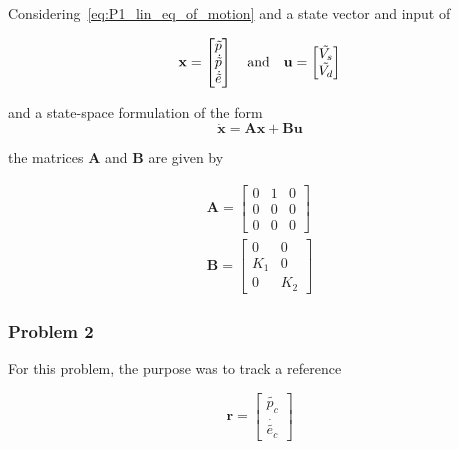 Considering~\cref{eq:P1_lin_eq_of_motion} and a state vector and input of  

\begin{equation}\label{P3_state_vector_and_input}
    \mathbf{x}=
    \begin{bmatrix}
        \tilde{p}\\
        \dot{\tilde{p}}\\
        \dot{\tilde{e}}
    \end{bmatrix}
    \quad\text{and}\quad
    \mathbf{u}=
    \begin{bmatrix}
        \tilde{V_s}\\
        \tilde{V_d}
    \end{bmatrix}
\end{equation}

and a state-space formulation of the form
\begin{equation}\label{eq:P3_state_space_equation}
    \dot{\mathbf{x}}=\mathbf{Ax}+\mathbf{Bu}    
\end{equation}

the matrices $\mathbf{A}$ and $\mathbf{B}$ are given by 

\begin{subequations}\label{eq:P3_p1_A_B}
    \begin{align}
        \mathbf{A}=
            \begin{bmatrix}
                0&1&0\\
                0&0&0\\
                0&0&0
            \end{bmatrix}\label{eq:P3_p1_A} \\
        \mathbf{B}=
            \begin{bmatrix}
                0&0\\
                K_1&0\\
                0&K_2
            \end{bmatrix}\label{eq:P3_p1_B}
    \end{align}
\end{subequations}

\subsubsection{Problem 2}

For this problem, the purpose was to track a reference

\begin{equation}\label{eq:P3_p2_reference}
    \mathbf{r}=
        \begin{bmatrix}
            \tilde{p_c}\\
            \dot{\tilde{e_c}}
        \end{bmatrix}
\end{equation}

